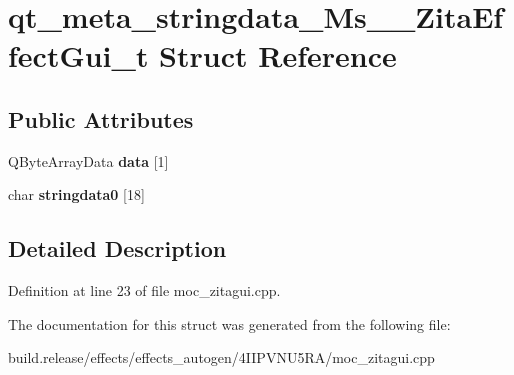 \hypertarget{structqt__meta__stringdata___ms_____zita_effect_gui__t}{}\section{qt\+\_\+meta\+\_\+stringdata\+\_\+\+Ms\+\_\+\+\_\+\+Zita\+Effect\+Gui\+\_\+t Struct Reference}
\label{structqt__meta__stringdata___ms_____zita_effect_gui__t}
\subsection*{Public Attributes}
\begin{DoxyCompactItemize}
\item 
\mbox{\label{structqt__meta__stringdata___ms_____zita_effect_gui__t_ae2bff1bfd2a4bd0ce92f95f5b0080a6c}} 
Q\+Byte\+Array\+Data {\bfseries data} \mbox{[}1\mbox{]}
\item 
\mbox{\label{structqt__meta__stringdata___ms_____zita_effect_gui__t_aa960241691ce776ca88797dabaaed60f}} 
char {\bfseries stringdata0} \mbox{[}18\mbox{]}
\end{DoxyCompactItemize}


\subsection{Detailed Description}


Definition at line 23 of file moc\+\_\+zitagui.\+cpp.



The documentation for this struct was generated from the following file\+:\begin{DoxyCompactItemize}
\item 
build.\+release/effects/effects\+\_\+autogen/4\+I\+I\+P\+V\+N\+U5\+R\+A/moc\+\_\+zitagui.\+cpp\end{DoxyCompactItemize}
